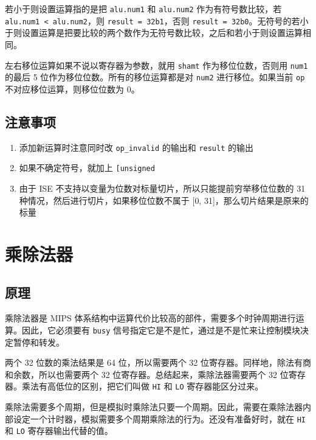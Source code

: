\documentclass[12pt,AutoFakeBold,AutoFakeSlant]{article}
\providecommand{\tightlist}{%
  \setlength{\itemsep}{0pt}\setlength{\parskip}{0pt}}
\begin{document}
若小于则设置运算指的是把 \texttt{alu.num1} 和 \texttt{alu.num2}
作为有符号数比较，若 \texttt{alu.num1\ \textless{}\ alu.num2}，则
\texttt{result\ =\ 32\textquotesingle{}b1}，否则
\texttt{result\ =\ 32\textquotesingle{}b0}。无符号的若小于则设置运算是把要比较的两个数作为无符号数比较，之后和若小于则设置运算相同。

左右移位运算如果不说以寄存器为参数，就用 \texttt{shamt}
作为移位位数，否则用 \texttt{num1} 的最后 5
位作为移位位数。所有的移位运算都是对 \texttt{num2} 进行移位。如果当前
\texttt{op} 不对应移位运算，则移位位数为 0。

\hypertarget{ux6ce8ux610fux4e8bux9879-4}{%
\subsection{注意事项}\label{ux6ce8ux610fux4e8bux9879-4}}

\begin{enumerate}
\def\labelenumi{\arabic{enumi}.}
\tightlist
\item
  添加新运算时注意同时改 \texttt{op\_invalid} 的输出和 \texttt{result}
  的输出
\item
  如果不确定符号，就加上 \texttt{{[}un\textbar{}{]}signed}
\item
  由于 ISE 不支持以变量为位数对标量切片，所以只能提前穷举移位位数的 31
  种情况，然后进行切片，如果移位位数不属于 {[}0,
  31{]}，那么切片结果是原来的标量
\end{enumerate}

\hypertarget{ux4e58ux9664ux6cd5ux5668}{%
\section{乘除法器}\label{ux4e58ux9664ux6cd5ux5668}}

\hypertarget{ux539fux7406-6}{%
\subsection{原理}\label{ux539fux7406-6}}

乘除法器是 MIPS 体系结构中运算代价比较高的部件，需要多个时钟周期进行运算。因此，它必须要有
\texttt{busy} 信号指定它是不是忙，通过是不是忙来让控制模块决定暂停和转发。

两个 32 位数的乘法结果是 64 位，所以需要两个 32
位寄存器。同样地，除法有商和余数，所以也需要两个 32
位寄存器。总结起来，乘除法器需要两个 32
位寄存器。乘法有高低位的区别，把它们叫做 \texttt{HI} 和 \texttt{LO}
寄存器能区分过来。

乘除法需要多个周期，但是模拟时乘除法只要一个周期。因此，需要在乘除法器内部设定一个计时器，模拟需要多个周期乘除法的行为。还没有准备好时，就在
\texttt{HI} 和 \texttt{LO} 寄存器输出代替的值。
\end{document}
